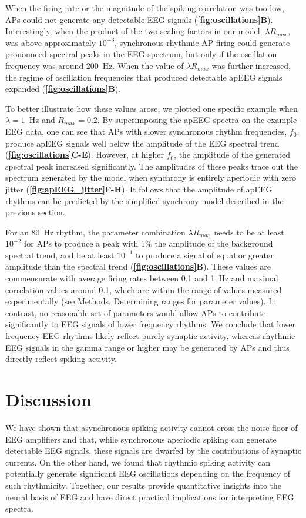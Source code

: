 When the firing rate or the magnitude of the spiking correlation was too low, APs could not generate any detectable EEG signals (\textbf{\autoref{fig:oscillations}B}). Interestingly, when the product of the two scaling factors in our model, $\lambda R_{max}$, was above approximately $10^{-3}$, synchronous rhythmic AP firing could generate pronounced spectral peaks in the EEG spectrum, but only if the oscillation frequency was around 200~\unit{\hertz}. When the value of $\lambda R_{max}$ was further increased, the regime of oscillation frequencies that produced detectable apEEG signals expanded (\textbf{\autoref{fig:oscillations}B}). 

To better illustrate how these values arose, we plotted one specific example when $\lambda=1$~\unit{\hertz} and $R_{max}=0.2$. By superimposing the apEEG spectra on the example EEG data, one can see that APs with slower synchronous rhythm frequencies, $f_0$, produce apEEG signals well below the amplitude of the EEG spectral trend (\textbf{\autoref{fig:oscillations}C-E}). However, at higher $f_0$, the amplitude of the generated spectral peak increased significantly. The amplitudes of these peaks trace out the spectrum generated by the model when synchrony is entirely aperiodic with zero jitter (\textbf{\autoref{fig:apEEG_jitter}F-H}). It follows that the amplitude of apEEG rhythms can be predicted by the simplified synchrony model described in the previous section. 

For an 80~\unit{\hertz} rhythm, the parameter combination $\lambda R_{max}$ needs to be at least $10^{-2}$ for APs to produce a peak with 1\% the amplitude of the background spectral trend, and be at least $10^{-1}$ to produce a signal of equal or greater amplitude than the spectral trend (\textbf{\autoref{fig:oscillations}B}).  These values are commensurate with average firing rates between 0.1 and 1~\unit{\hertz} and maximal correlation values around 0.1, which are within the range of values measured experimentally (see Methods, Determining ranges for parameter values). In contrast, no reasonable set of parameters would allow APs to contribute significantly to EEG signals of lower frequency rhythms. We conclude that lower frequency EEG rhythms likely reflect purely synaptic activity, whereas rhythmic EEG signals in the gamma range or higher may be generated by APs and thus directly reflect spiking activity.

\section{Discussion}
We have shown that asynchronous spiking activity cannot cross the noise floor of EEG amplifiers and that, while synchronous aperiodic spiking can generate detectable EEG signals, these signals are dwarfed by the contributions of synaptic currents. On the other hand, we found that rhythmic spiking activity can potentially generate significant EEG oscillations depending on the frequency of such rhythmicity. Together, our results provide quantitative insights into the neural basis of EEG and have direct practical implications for interpreting EEG spectra. 

